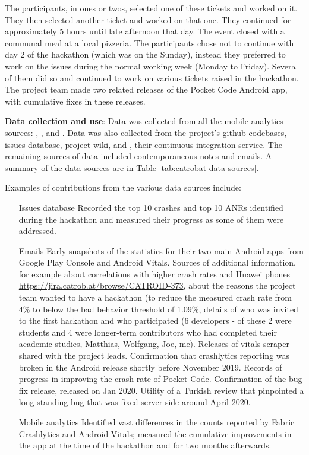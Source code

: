 The participants, in ones or twos, selected one of these tickets and worked on it. They then selected another ticket and worked on that one. They continued for approximately 5 hours until late afternoon that day. The event closed with a communal meal at a local pizzeria. The participants chose not to continue with day 2 of the hackathon (which was on the Sunday), instead they preferred to work on the issues during the normal working week (Monday to Friday). Several of them did so and continued to work on various tickets raised in the hackathon. The project team made two related releases of the Pocket Code Android app, with cumulative fixes in these releases.

\textbf{Data collection and use}: Data was collected from all the mobile analytics sources: , ,  and . Data was also collected from the project's github codebases, issues database,  project wiki, and , their continuous integration service. The remaining sources of data included contemporaneous notes and emails. A summary of the data sources are in Table \ref{tab:catrobat-data-sources}.

Examples of contributions from the various data sources include:
\begin{itemize}
    \item[Issues database] Recorded the top 10 crashes and top 10 ANRs identified during the hackathon and measured their progress as some of them were addressed.
    \item[Emails] Early snapshots of the statistics for their two main Android apps from Google Play Console and Android Vitals. Sources of additional information, for example about correlations with higher crash rates and Huawei phones \url{https://jira.catrob.at/browse/CATROID-373}, about the reasons the project team wanted to have a hackathon (to reduce the measured crash rate from 4\% to below the bad behavior threshold of 1.09\%, details of who was invited to the first hackathon and who participated (6 developers - of these 2 were students and 4 were longer-term contributors who had completed their academic studies, Matthias, Wolfgang, Joe, me). Releases of vitals scraper shared with the project leads. Confirmation that crashlytics reporting was broken in the Android release shortly before  November 2019. Records of progress in improving the crash rate of Pocket Code. Confirmation of the bug fix release, released on  Jan 2020. Utility of a Turkish review that pinpointed a long standing bug that was fixed server-side around  April 2020.
    \item[Mobile analytics] Identified vast differences in the counts reported by Fabric Crashlytics and Android Vitals; measured the cumulative improvements in the app at the time of the hackathon and for two months afterwards. 
\end{itemize}

